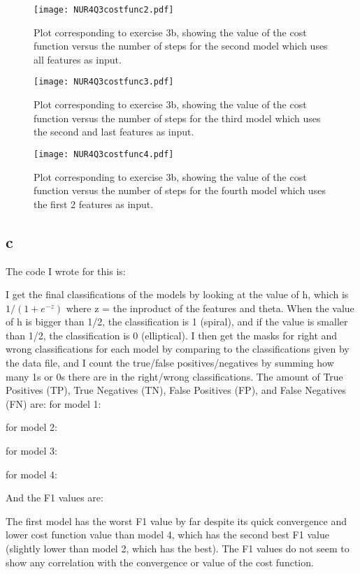 \begin{figure}[h!]
  \centering
  \texttt{[image: NUR4Q3costfunc2.pdf]}
  \caption{Plot corresponding to exercise 3b, showing the value of the cost function versus the number of steps for the second model which uses all features as input.}
  \label{fig:fig3}
\end{figure} 


\begin{figure}[h!]
  \centering
  \texttt{[image: NUR4Q3costfunc3.pdf]}
  \caption{Plot corresponding to exercise 3b, showing the value of the cost function versus the number of steps for the third model which uses the second and last features as input.}
  \label{fig:fig4}
\end{figure} 


\begin{figure}[h!]
  \centering
  \texttt{[image: NUR4Q3costfunc4.pdf]}
  \caption{Plot corresponding to exercise 3b, showing the value of the cost function versus the number of steps for the fourth model which uses the first 2 features as input.}
  \label{fig:fig5}
\end{figure} 


\subsection*{c}

The code I wrote for this is:


I get the final classifications of the models by looking at the value of h, which is $1/(1+e^{-z})$ where z = the inproduct of the features and theta. 
When the value of h is bigger than 1/2, the classification is 1 (spiral), and if the value is smaller than 1/2, the classification is 0 (elliptical). 
I then get the masks for right and wrong classifications for each model by comparing to the classifications given by the data file, and I count the true/false positives/negatives by summing how many 1s or 0s there are in the right/wrong classifications. 
The amount of True Positives (TP), True Negatives (TN), False Positives (FP), and False Negatives (FN) are:
for model 1:

for model 2:

for model 3:

for model 4:

And the F1 values are:


The first model has the worst F1 value by far despite its quick convergence and lower cost function value than model 4, which has the second best F1 value (slightly lower than model 2, which has the best). The F1 values do not seem to show any correlation with the convergence or value of the cost function. 


